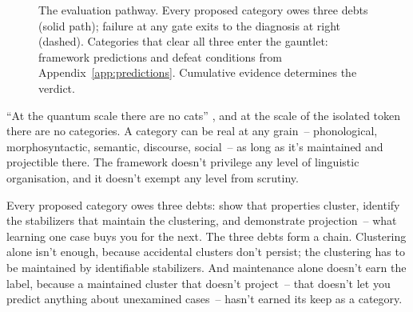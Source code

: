 \begin{figure}[htbp]
{}%
\caption{The evaluation pathway. Every proposed category owes three debts (solid path); failure at any gate exits to the diagnosis at right (dashed). Categories that clear all three enter the gauntlet: framework predictions and defeat conditions from Appendix~\ref{app:predictions}. Cumulative evidence determines the verdict.}
\label{fig:17:gauntlet}
\end{figure}

\enquote{At the quantum scale there are no cats} \citep[199]{ladyman2007}, and at the scale of the isolated token there are no categories. A category can be real at any grain~-- phonological, morphosyntactic, semantic, discourse, social~-- as long as it's maintained and projectible there. The framework doesn't privilege any level of linguistic organisation, and it doesn't exempt any level from scrutiny.

Every proposed category owes three debts: show that properties cluster, identify the stabilizers that maintain the clustering, and demonstrate projection~-- what learning one case buys you for the next. The three debts form a chain. Clustering alone isn't enough, because accidental clusters don't persist; the clustering has to be maintained by identifiable stabilizers. And maintenance alone doesn't earn the label, because a maintained cluster that doesn't project~-- that doesn't let you predict anything about unexamined cases~-- hasn't earned its keep as a category.

